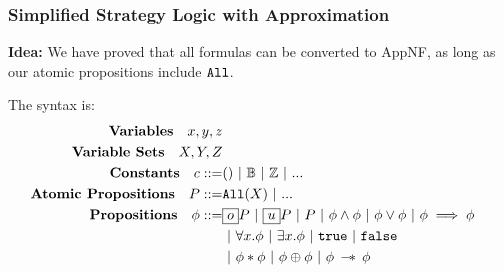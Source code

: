\begin{frame}[fragile]
    \frametitle{Simplified Strategy Logic with Approximation}

\textbf{Idea:} We have proved that all formulas can be converted to AppNF, as long as our atomic propositions include ${\tt All}$.

\begin{definition} The syntax is:
\begin{align*}
    \textbf{Variables} \quad x, y, z  \\
    \textbf{Variable Sets} \quad X, Y, Z \\
    \textbf{Constants} \quad c ::= & () ~|~ \mathbb{B} ~|~ \mathbb{Z} ~|~ ...  \\
    \textbf{Atomic Propositions} \quad P ::= & \Code{All}(X) ~|~ ...  \\
    \textbf{Propositions} \quad \phi ::= & \subExt P ~|~ \supExt P ~|~ P ~|~ \phi \land \phi ~|~ \phi \lor \phi ~|~ \phi \implies \phi\\
    & ~|~ \forall x. \phi ~|~ \exists x. \phi ~|~ \true ~|~ \false \\
    & ~|~ \phi * \phi ~|~ \phi \oplus \phi ~|~ \phi \wand \phi
\end{align*}
\end{definition}

\end{frame}